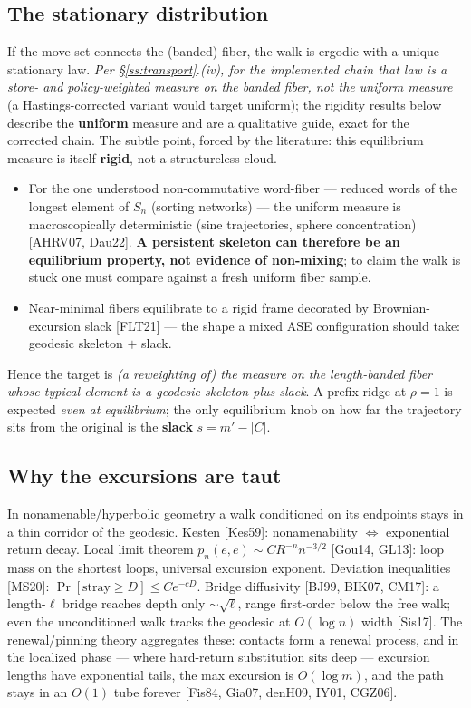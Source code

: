 \documentclass[11pt]{article}
\begin{document}
\subsection{The stationary distribution}\label{ss:stat}
If the move set connects the (banded) fiber, the walk is ergodic with a unique stationary law.
\emph{Per \S\ref{ss:transport}.(iv), for the implemented chain that law is a store- and
policy-weighted measure on the banded fiber, not the uniform measure} (a Hastings-corrected variant
would target uniform); the rigidity results below describe the \textbf{uniform} measure and are a
qualitative guide, exact for the corrected chain. The subtle point, forced by the literature: this
equilibrium measure is itself \textbf{rigid}, not a structureless cloud.
\begin{itemize}
\item For the one understood non-commutative word-fiber --- reduced words of the longest element of
$S_n$ (sorting networks) --- the uniform measure is macroscopically deterministic (sine trajectories,
sphere concentration) [AHRV07, Dau22]. \textbf{A persistent skeleton can therefore be an equilibrium
property, not evidence of non-mixing}; to claim the walk is stuck one must compare against a fresh
uniform fiber sample.
\item Near-minimal fibers equilibrate to a rigid frame decorated by Brownian-excursion slack [FLT21]
--- the shape a mixed ASE configuration should take: geodesic skeleton $+$ slack.
\end{itemize}
Hence the target is \emph{(a reweighting of) the measure on the length-banded fiber whose typical
element is a geodesic skeleton plus slack}. A prefix ridge at $\rho=1$ is expected \emph{even at
equilibrium}; the only equilibrium knob on how far the trajectory sits from the original is the
\textbf{slack} $s=m'-|C|$.

\subsection{Why the excursions are taut}\label{ss:taut}
In nonamenable/hyperbolic geometry a walk conditioned on its endpoints stays in a thin corridor of the
geodesic. Kesten [Kes59]: nonamenability $\Leftrightarrow$ exponential return decay. Local limit theorem
$p_n(e,e)\sim C R^{-n} n^{-3/2}$ [Gou14, GL13]: loop mass on the shortest loops, universal excursion
exponent. Deviation inequalities [MS20]: $\Pr[\text{stray}\ge D]\le Ce^{-cD}$. Bridge diffusivity
[BJ99, BIK07, CM17]: a length-$\ell$ bridge reaches depth only $\sim\sqrt\ell$, range first-order below
the free walk; even the unconditioned walk tracks the geodesic at $O(\log n)$ width [Sis17]. The renewal/pinning theory aggregates these: contacts form a renewal process, and in the
localized phase --- where hard-return substitution sits deep --- excursion lengths have exponential
tails, the max excursion is $O(\log m)$, and the path stays in an $O(1)$ tube forever
[Fis84, Gia07, denH09, IY01, CGZ06].
\end{document}
